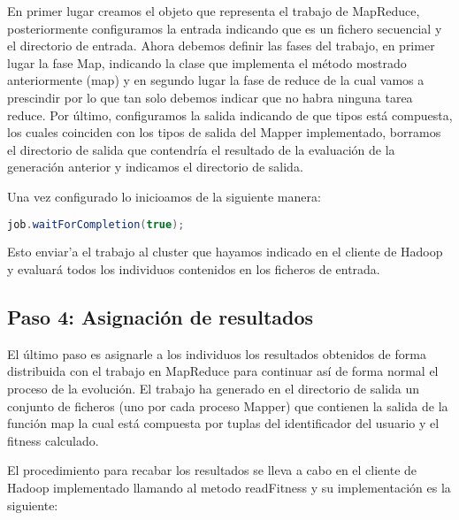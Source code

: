 En primer lugar creamos el objeto que representa el trabajo de MapReduce, posteriormente configuramos la entrada indicando que es un fichero secuencial y el directorio de entrada. Ahora debemos definir las fases del trabajo, en primer lugar la fase Map, indicando la clase que implementa el método mostrado anteriormente (map) y en segundo lugar la fase de reduce de la cual vamos a prescindir por lo que tan solo debemos indicar que no habra ninguna tarea reduce. Por \'ultimo, configuramos la salida indicando de que tipos est\'a compuesta, los cuales coinciden con los tipos de salida del Mapper implementado, borramos el directorio de salida que contendría el resultado de la evaluación de la generación anterior y indicamos el directorio de salida.

Una vez configurado lo inicioamos de la siguiente manera:

\begin{lstlisting}[language=Java]
	job.waitForCompletion(true);
\end{lstlisting}

Esto enviar'a el trabajo al cluster que hayamos indicado en el cliente de Hadoop y evaluar\'a todos los individuos contenidos en los ficheros de entrada.

\subsection{Paso 4: Asignaci\'on de resultados}

El \'ultimo paso es asignarle a los individuos los resultados obtenidos de forma distribuida con el trabajo en MapReduce para continuar así de forma normal el proceso de la evoluci\'on. El trabajo ha generado en el directorio de salida un conjunto de ficheros (uno por cada proceso Mapper) que contienen la salida de la función map la cual est\'a compuesta por tuplas del identificador del usuario y el fitness calculado.

El procedimiento para recabar los resultados se lleva a cabo en el cliente de Hadoop implementado llamando al metodo readFitness y su implementación es la siguiente:

